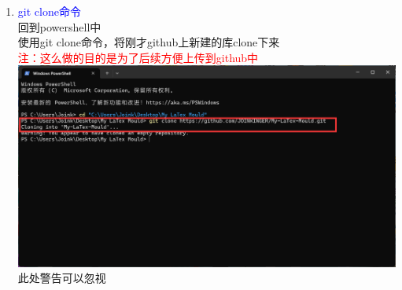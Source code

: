 \documentclass[12pt,a4paper,UTF8]{article}
\begin{document}
\begin{enumerate}
        \item \textcolor{blue}{git clone命令}\\
        回到powershell中\\
        使用git clone命令，将刚才github上新建的库clone下来\\[6pt]
        \textcolor{red}{注：这么做的目的是为了后续方便上传到github中}\\
        \includegraphics[scale=0.25]{pictures/git/16.png}
        此处警告可以忽视
        

\end{enumerate}
\end{document}

